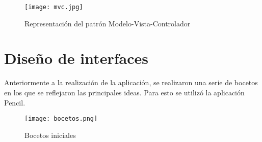 \begin{figure}[!h]
	\centering
	\texttt{[image: mvc.jpg]}
	\caption{Representación del patrón Modelo-Vista-Controlador}\label{fig:mvc}
\end{figure}



\section{Diseño de interfaces}

Anteriormente a la realización de la aplicación, se realizaron una serie de bocetos en los que se reflejaron las principales ideas. Para esto se utilizó la aplicación Pencil.

\begin{figure}[!h]
	\centering
	\texttt{[image: bocetos.png]}
	\caption{Bocetos iniciales}\label{fig:bocetos}
\end{figure}







